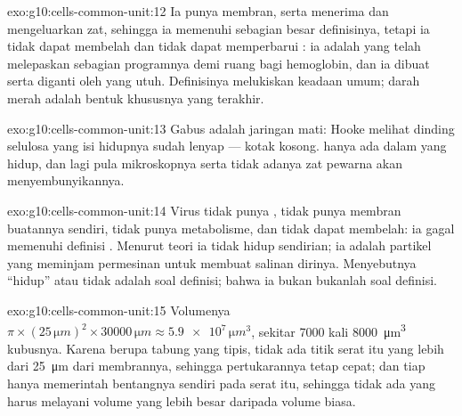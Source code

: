 \begin{solution}{exo:g10:cells-common-unit:12}
Ia punya membran,  serta menerima dan mengeluarkan zat,
sehingga ia memenuhi sebagian besar definisinya, tetapi ia tidak dapat
membelah dan tidak dapat memperbarui : ia adalah  yang
telah melepaskan sebagian programnya demi ruang bagi hemoglobin, dan
ia dibuat serta diganti oleh  yang utuh. Definisinya melukiskan
keadaan umum;  darah merah adalah bentuk khususnya yang terakhir.
\end{solution}

\begin{solution}{exo:g10:cells-common-unit:13}
Gabus adalah jaringan mati: Hooke melihat dinding selulosa  yang isi
hidupnya sudah lenyap --- kotak kosong.  hanya ada dalam
  yang hidup, dan lagi pula  mikroskopnya serta
tidak adanya zat pewarna akan menyembunyikannya.
\end{solution}

\begin{solution}{exo:g10:cells-common-unit:14}
Virus tidak punya , tidak punya membran buatannya sendiri,
tidak punya metabolisme, dan tidak dapat membelah: ia gagal memenuhi
definisi . Menurut teori  ia tidak hidup sendirian; ia adalah
partikel yang meminjam permesinan  untuk membuat salinan dirinya.
Menyebutnya ``hidup'' atau tidak adalah soal definisi; bahwa ia bukan
 bukanlah soal definisi.
\end{solution}

\begin{solution}{exo:g10:cells-common-unit:15}
Volumenya $\pi \times (25\,\unit{\micro m})^2 \times 30000\,\unit{\micro m}
\approx \num{5.9e7}\,\unit{\micro m^3}$, sekitar 7000 kali
\qty{8000}{\micro m^3} kubusnya. Karena berupa tabung yang tipis, tidak
ada titik serat itu yang lebih dari \qty{25}{\micro m} dari membrannya,
sehingga pertukarannya tetap cepat; dan tiap  hanya memerintah
bentangnya sendiri pada serat itu, sehingga tidak ada  yang
harus melayani volume yang lebih besar daripada volume  biasa.
\end{solution}

